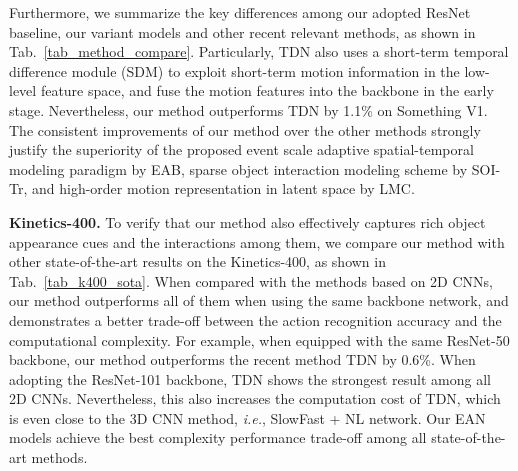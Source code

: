 Furthermore, we summarize the key differences among our adopted ResNet baseline, our variant models and
other recent relevant methods, as shown in Tab.~\ref{tab_method_compare}.
Particularly, TDN also uses a short-term temporal difference module (SDM) to exploit short-term motion information in the low-level feature space, and fuse the motion features into the backbone in the early stage. Nevertheless, our method outperforms TDN by 1.1\% on Something V1.
The consistent improvements of our method over the other methods strongly justify the superiority of the proposed event scale adaptive spatial-temporal modeling paradigm by EAB, sparse object interaction modeling scheme by SOI-Tr, and high-order motion representation in latent space by LMC.








 \textbf {Kinetics-400.}
To verify that our method also effectively captures rich object appearance cues and the interactions among them, we compare our method with other state-of-the-art results on the Kinetics-400, as shown in Tab.~\ref{tab_k400_sota}.
When compared with the methods based on 2D CNNs, our method outperforms all of them when using the same backbone network, and demonstrates a better trade-off between the action recognition accuracy and the computational complexity.
For example, when equipped with the same ResNet-50 backbone, our method outperforms the recent method TDN by 0.6\%.
When adopting the ResNet-101 backbone, TDN shows the strongest result among all 2D CNNs. Nevertheless, this also increases the computation cost of TDN, which is even close to the 3D CNN method, \textit{i.e.}, SlowFast + NL network.
Our EAN models achieve the best complexity performance trade-off among all state-of-the-art methods.



